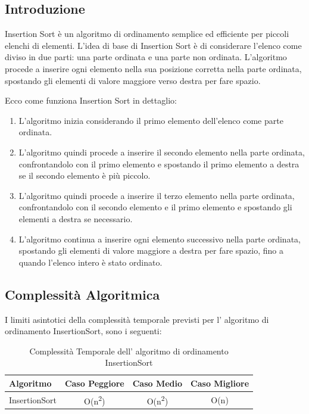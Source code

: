 \documentclass{article}
\begin{document}
		\subsection{Introduzione}
			Insertion Sort è un algoritmo di ordinamento semplice ed efficiente per piccoli elenchi di elementi. L'idea di base di Insertion Sort è di considerare l'elenco come diviso in due parti: una parte ordinata e una parte non ordinata. L'algoritmo procede a inserire ogni elemento nella sua posizione corretta nella parte ordinata, spostando gli elementi di valore maggiore verso destra per fare spazio.
			
			Ecco come funziona Insertion Sort in dettaglio:
			\begin{enumerate}
				\item L'algoritmo inizia considerando il primo elemento dell'elenco come parte ordinata.
				
				\item L'algoritmo quindi procede a inserire il secondo elemento nella parte ordinata, confrontandolo con il primo elemento e spostando il primo elemento a destra se il secondo elemento è più piccolo.
				
				\item L'algoritmo quindi procede a inserire il terzo elemento nella parte ordinata, confrontandolo con il secondo elemento e il primo elemento e spostando gli elementi a destra se necessario.
				
				\item L'algoritmo continua a inserire ogni elemento successivo nella parte ordinata, spostando gli elementi di valore maggiore a destra per fare spazio, fino a quando l'elenco intero è stato ordinato.
			\end{enumerate}
		
		\subsection{Complessità Algoritmica}
			I limiti asintotici della complessità temporale previsti per l' algoritmo di ordinamento InsertionSort, sono i seguenti:
			
			\begin{table}[ht]
				\centering
				\begin{tabular}{|l|ccc|}
					\rowcolor[HTML]{C0C0C0}
					\hline
					Algoritmo    		& Caso Peggiore & Caso Medio & Caso Migliore \\
					\hline
					InsertionSort       	& O(n\textsuperscript{2})          & O(n\textsuperscript{2})    & O(n)          \\
					\hline
				\end{tabular}
				\caption{Complessità Temporale dell' algoritmo di ordinamento InsertionSort}
			\end{table}
\end{document}
